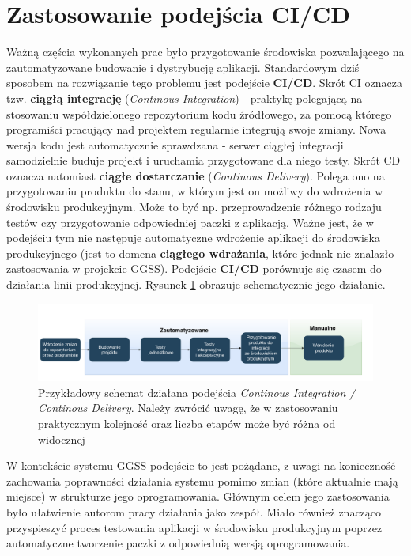 \section{Zastosowanie podejścia CI/CD}
Ważną częścia wykonanych prac było przygotowanie środowiska pozwalającego na zautomatyzowane budowanie i dystrybucję aplikacji. Standardowym dziś sposobem na rozwiązanie tego problemu jest podejście \textbf{CI/CD}. Skrót CI oznacza tzw. \textbf{ciągłą integrację} (\textit{Continous Integration}) - praktykę polegającą na stosowaniu współdzielonego repozytorium kodu źródłowego, za pomocą którego programiści pracujący nad projektem regularnie integrują swoje zmiany. Nowa wersja kodu jest automatycznie sprawdzana - serwer ciągłej integracji samodzielnie buduje projekt i uruchamia przygotowane dla niego testy. Skrót CD oznacza natomiast \textbf{ciągłe dostarczanie} (\textit{Continous Delivery}). Polega ono na przygotowaniu produktu do stanu, w którym jest on możliwy do wdrożenia w środowisku produkcyjnym. Może to być np. przeprowadzenie różnego rodzaju testów czy przygotowanie odpowiedniej paczki z aplikacją. Ważne jest, że w podejściu tym nie następuje automatyczne wdrożenie aplikacji do środowiska produkcyjnego (jest to domena \textbf{ciągłego wdrażania}, które jednak nie znalazło zastosowania w projekcie GGSS). Podejście \textbf{CI/CD} porównuje się czasem do działania linii produkcyjnej. Rysunek \ref{fig:cicd} obrazuje schematycznie jego działanie. 

\begin{figure}[H]
\centering
\caption{Przykładowy schemat działana podejścia \textit{Continous Integration / Continous Delivery}. Należy zwrócić uwagę, że w zastosowaniu praktycznym kolejność oraz liczba etapów może być różna od widocznej}
\label{fig:cicd}
\includegraphics[width=\textwidth]{res/CICD.pdf}
\end{figure}

W kontekście systemu GGSS podejście to jest pożądane, z uwagi na konieczność zachowania poprawności działania systemu pomimo zmian (które aktualnie mają miejsce) w strukturze jego oprogramowania. Głównym celem jego zastosowania było ułatwienie autorom pracy działania jako zespół. Miało również znacząco przyspieszyć proces testowania aplikacji w środowisku produkcyjnym poprzez automatyczne tworzenie paczki z odpowiednią wersją oprogramowania.

